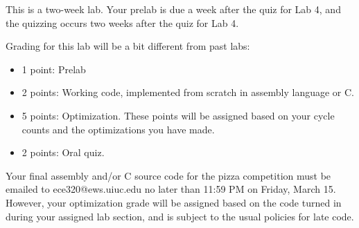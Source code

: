 This is a two-week lab. Your prelab is due a week after the
quiz for Lab 4, and
the quizzing occurs two weeks after the quiz for Lab 4. 

Grading for this lab will be a bit different from past labs:

\begin{itemize}
\item 1 point: Prelab
\item 2 points: Working code, implemented from scratch in 
	assembly language or C. 
\item 5 points: Optimization. These points will be assigned
	based on your cycle counts and the optimizations
 	you have made. 
\item 2 points: Oral quiz. 
\end{itemize}

Your final assembly and/or C source code for the pizza 
competition must be emailed to ece320@ews.uiuc.edu no 
later than 11:59 PM on Friday, March 15.  
However, your
optimization grade will be assigned based on the 
code turned in during your assigned lab section,
and is subject to the usual policies for late code.
